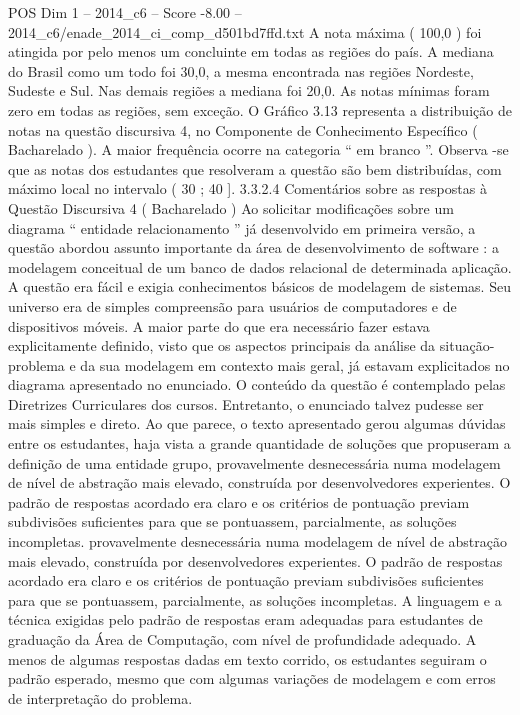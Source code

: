 \begin{textsample}{POS Dim 1 – 2014\_c6 – Score -8.00 – 2014\_c6/enade\_2014\_ci\_comp\_d501bd7ffd.txt}
A nota máxima ( 100,0 ) foi atingida por pelo menos um concluinte em todas as regiões do país.
A mediana do Brasil como um todo foi 30,0, a mesma encontrada nas regiões Nordeste, Sudeste e Sul.
Nas demais regiões a mediana foi 20,0.
As notas mínimas foram zero em todas as regiões, sem exceção.
O Gráfico 3.13 representa a distribuição de notas na questão discursiva 4, no Componente de Conhecimento Específico ( Bacharelado ).
A maior frequência ocorre na categoria “ em branco ”.
Observa -se que as notas dos estudantes que resolveram a questão são bem distribuídas, com máximo local no intervalo ( 30 ; 40 ]. 3.3.2.4 Comentários sobre as respostas à Questão Discursiva 4 ( Bacharelado ) Ao solicitar modificações sobre um diagrama “ entidade relacionamento ” já desenvolvido em primeira versão, a questão abordou assunto importante da área de desenvolvimento de software : a modelagem conceitual de um banco de dados relacional de determinada aplicação.
A questão era fácil e exigia conhecimentos básicos de modelagem de sistemas.
Seu universo era de simples compreensão para usuários de computadores e de dispositivos móveis.
A maior parte do que era necessário fazer estava explicitamente definido, visto que os aspectos principais da análise da situação-problema e da sua modelagem em contexto mais geral, já estavam explicitados no diagrama apresentado no enunciado.
O conteúdo da questão é contemplado pelas Diretrizes Curriculares dos cursos.
Entretanto, o enunciado talvez pudesse ser mais simples e direto.
Ao que parece, o texto apresentado gerou algumas dúvidas entre os estudantes, haja vista a grande quantidade de soluções que propuseram a definição de uma entidade grupo, provavelmente desnecessária numa modelagem de nível de abstração mais elevado, construída por desenvolvedores experientes.
O padrão de respostas acordado era claro e os critérios de pontuação previam subdivisões suficientes para que se pontuassem, parcialmente, as soluções incompletas. provavelmente desnecessária numa modelagem de nível de abstração mais elevado, construída por desenvolvedores experientes.
O padrão de respostas acordado era claro e os critérios de pontuação previam subdivisões suficientes para que se pontuassem, parcialmente, as soluções incompletas.
A linguagem e a técnica exigidas pelo padrão de respostas eram adequadas para estudantes de graduação da Área de Computação, com nível de profundidade adequado.
A menos de algumas respostas dadas em texto corrido, os estudantes seguiram o padrão esperado, mesmo que com algumas variações de modelagem e com erros de interpretação do problema.

\end{textsample}
